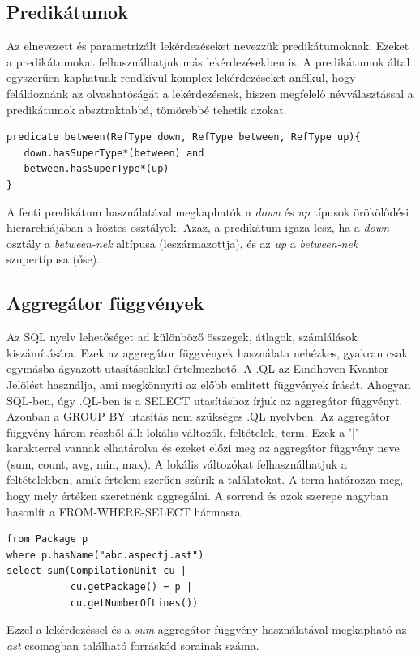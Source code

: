 \documentclass[a4paper,12pt]{report}
\begin{document}
\subsection{Predikátumok}
\par Az elnevezett és parametrizált lekérdezéseket nevezzük predikátumoknak. Ezeket a predikátumokat felhasználhatjuk más lekérdezésekben is. A predikátumok által egyszerűen kaphatunk rendkívül komplex lekérdezéseket anélkül, hogy feláldoznánk az olvashatóságát a lekérdezésnek, hiszen megfelelő névválasztással a predikátumok absztraktabbá, tömörebbé tehetik azokat.
\begin{verbatim}
predicate between(RefType down, RefType between, RefType up){
   down.hasSuperType*(between) and
   between.hasSuperType*(up)
}
\end{verbatim}
A fenti predikátum használatával megkaphatók a \textit{down} és \textit{up} típusok örökölődési hierarchiájában a köztes osztályok. Azaz, a predikátum igaza lesz, ha a \textit{down} osztály a \textit{between-nek} altípusa (leszármazottja), és az \textit{up} a \textit{between-nek} szupertípusa (őse).
\subsection{Aggregátor függvények}
Az SQL nyelv lehetőséget ad különböző összegek, átlagok, számlálások kiszámítására. Ezek az aggregátor függvények használata nehézkes, gyakran csak egymásba ágyazott utasításokkal értelmezhető. A .QL az Eindhoven Kvantor Jelölést használja, ami megkönnyíti az előbb említett függvények írását. Ahogyan SQL-ben, úgy .QL-ben is a SELECT utasításhoz írjuk az aggregátor függvényt. Azonban a GROUP BY utasítás nem szükséges .QL nyelvben. Az aggregátor függvény három részből áll: lokális változók, feltételek, term. Ezek a ’|’ karakterrel vannak elhatárolva és ezeket előzi meg az aggregátor függvény neve (sum, count, avg, min, max). A lokális változókat felhasználhatjuk a feltételekben, amik értelem szerűen szűrik a találatokat. A term határozza meg, hogy mely értéken szeretnénk aggregálni. A sorrend és azok szerepe nagyban hasonlít a FROM-WHERE-SELECT hármasra.
\begin{verbatim}
from Package p
where p.hasName("abc.aspectj.ast")
select sum(CompilationUnit cu |
           cu.getPackage() = p |
           cu.getNumberOfLines())
\end{verbatim}
Ezzel a lekérdezéssel és a \textit{sum} aggregátor függvény használatával megkapható az \textit{ast} csomagban található forráskód sorainak száma.
\end{document}
